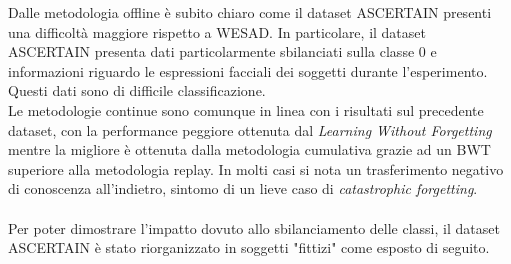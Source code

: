Dalle metodologia offline è subito chiaro come il dataset ASCERTAIN presenti una difficoltà maggiore rispetto a WESAD. In particolare, il dataset ASCERTAIN presenta dati particolarmente sbilanciati sulla classe 0 e informazioni riguardo le espressioni facciali dei soggetti durante l'esperimento. Questi dati sono di difficile classificazione.\\
Le metodologie continue sono comunque in linea con i risultati sul precedente dataset, con la performance peggiore ottenuta dal \textit{Learning Without Forgetting} mentre la migliore è ottenuta dalla metodologia cumulativa grazie ad un BWT superiore alla metodologia replay. In molti casi si nota un trasferimento negativo di conoscenza all'indietro, sintomo di un lieve caso di \textit{catastrophic forgetting}.\\\\
Per poter dimostrare l'impatto dovuto allo sbilanciamento delle classi, il dataset ASCERTAIN è stato riorganizzato in soggetti "fittizi" come esposto di seguito.

